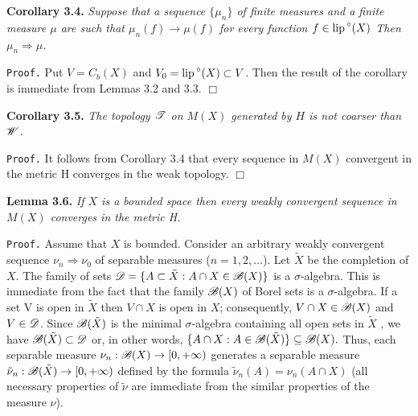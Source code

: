 \documentclass[11pt,a4paper]{article}
\begin{document}
\vspace{1em} {\bf Corollary 3.4.} \sl
Suppose that a sequence $\{\mu_n\}$ of finite measures
and a finite measure $\mu$ are such
that $\mu_n(f)\to\mu(f)$ for every function $f\in{\rm lip\,}^{\circ}(X)$
Then $\mu_n\Rightarrow\mu$. \rm
\vspace{1em} %

{\tt Proof.}
Put $V=C_b(X)$ and $V_0={\rm lip\,}^{\circ}(X)\subset V$.
Then the result of the corollary is immediate from Lemmas 3.2 and 3.3.
\hbox{$\Box$} \vspace{1em}

{\bf Corollary 3.5.} \sl
The topology ${\cal T}$ on $M(X)$ generated by $H$
is not coarser than ${\cal W}$. \rm
\vspace{1em} %

{\tt Proof.}
It follows from Corollary 3.4 that every sequence in $M(X)$ convergent in the metric H
converges in the weak topology.
\hbox{$\Box$}

\vspace{1em} {\bf Lemma 3.6.} \sl
If $X$ is a bounded space then every weakly convergent sequence in $M(X)$ converges
in the metric H. \rm
\vspace{1em} %

{\tt Proof.}
Assume that $X$ is bounded.
Consider an arbitrary weakly convergent sequence
$\nu_n\Rightarrow\nu_0$ of separable measures ($n=1,2,\ldots$).
Let $\tilde{X}$ be the completion of $X$. The family of sets
${{\cal D}=\{A\subset\tilde{X}: A\cap X\in{\cal B}(X)\}}$
is a $\sigma$-algebra.
This is immediate from the fact that the family ${\cal B}(X)$ of Borel sets is a $\sigma$-algebra.
If a set V is open in $\tilde{X}$
then $V\cap X$ is open in $X$; consequently,
$V\cap X\in{\cal B}(X)$ and $V\in{\cal D}$.
Since ${\cal B}(\tilde{X})$ is the minimal $\sigma$-algebra
containing all open sets in $\tilde{X}$ , we have
${\cal B}(\tilde{X})\subset{\cal D}$ or, in other words,
$\{ A\cap X: A\in{\cal B}(\tilde{X})\}\subseteq {\cal B}(X).$
Thus, each separable measure $\nu_n:{\cal B}(X)\to[0,+\infty)$
generates a separable measure $\tilde{\nu}_n:{\cal B}(\tilde{X})\to[0,+\infty)$
defined by the formula
$\tilde{\nu}_n(A)=\nu_n(A\cap X)$ %
(all necessary properties of $\tilde{\nu}$ are immediate from the similar
properties of the measure $\nu$).
\end{document}
